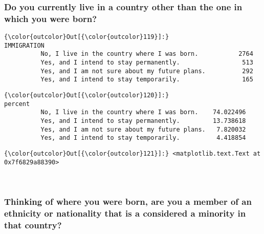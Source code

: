\documentclass[11pt]{article}
\begin{document}
    \subsubsection{Do you currently live in a country other than the one in
which you were
born?}\label{do-you-currently-live-in-a-country-other-than-the-one-in-which-you-were-born}


            \begin{Verbatim}[commandchars=\\\{\}]
{\color{outcolor}Out[{\color{outcolor}119}]:}                                                IMMIGRATION
          No, I live in the country where I was born.           2764
          Yes, and I intend to stay permanently.                 513
          Yes, and I am not sure about my future plans.          292
          Yes, and I intend to stay temporarily.                 165
\end{Verbatim}
        

            \begin{Verbatim}[commandchars=\\\{\}]
{\color{outcolor}Out[{\color{outcolor}120}]:}                                                  percent
          No, I live in the country where I was born.    74.022496
          Yes, and I intend to stay permanently.         13.738618
          Yes, and I am not sure about my future plans.   7.820032
          Yes, and I intend to stay temporarily.          4.418854
\end{Verbatim}
        

            \begin{Verbatim}[commandchars=\\\{\}]
{\color{outcolor}Out[{\color{outcolor}121}]:} <matplotlib.text.Text at 0x7f6829a88390>
\end{Verbatim}
        
    \begin{center}
    \end{center}
    { \hspace*{\fill} \\}
    
    \subsubsection{Thinking of where you were born, are you a member of an
ethnicity or nationality that is a considered a minority in that
country?}\label{thinking-of-where-you-were-born-are-you-a-member-of-an-ethnicity-or-nationality-that-is-a-considered-a-minority-in-that-country}
\end{document}
